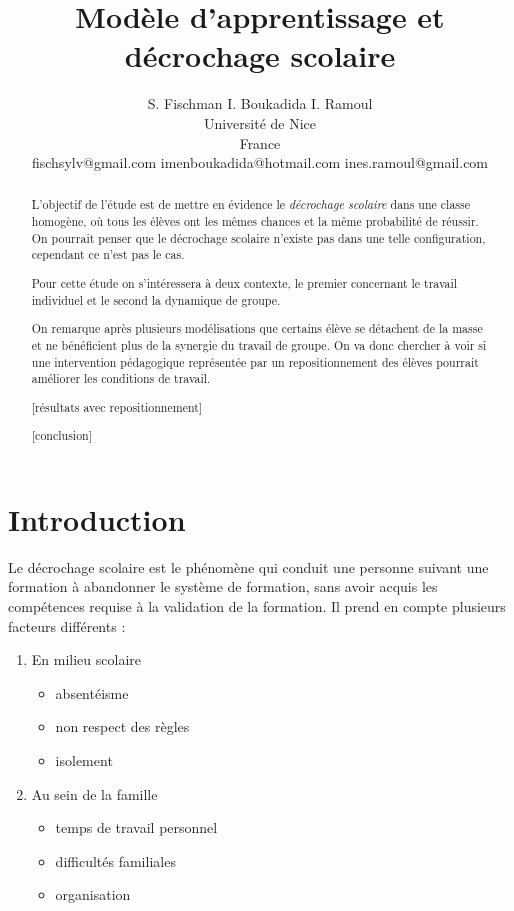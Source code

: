 \documentclass{article}
\title{Modèle d'apprentissage et décrochage scolaire}
\author{S. Fischman  I. Boukadida I. Ramoul\\
Université de Nice\\
France \\
fischsylv@gmail.com imenboukadida@hotmail.com ines.ramoul@gmail.com}
\begin{document}
\maketitle

\begin{abstract}
  L'objectif de l'étude est de mettre en évidence le {\it décrochage scolaire} dans une classe homogène, où tous les élèves ont les mêmes chances et la même probabilité de réussir. On pourrait penser que le décrochage scolaire n'existe pas dans une telle configuration, cependant ce n'est pas le cas. 
  
  Pour cette étude on s'intéressera à deux contexte, le premier concernant le travail individuel et le second la dynamique de groupe.
  
  On remarque après plusieurs modélisations que certains élève se détachent de la masse et ne bénéficient plus de la synergie du travail de groupe. On va donc chercher à voir si une intervention pédagogique représentée par un repositionnement des élèves pourrait améliorer les conditions de travail.
  
  [résultats avec repositionnement]
  
  [conclusion] 
\end{abstract}


\section{Introduction}
Le décrochage scolaire est le phénomène qui conduit une personne suivant une formation à abandonner le système de formation, sans avoir acquis les compétences requise à la validation de la formation. Il prend en compte plusieurs facteurs différents :
\begin{enumerate}
\item En milieu scolaire
\begin{itemize}
\item absentéisme
\item non respect des règles
\item isolement
\end{itemize}
\item Au sein de la famille
\begin{itemize}
\item temps de travail personnel
\item difficultés familiales
\item organisation
\end{itemize}
\end{enumerate}
\end{document}
